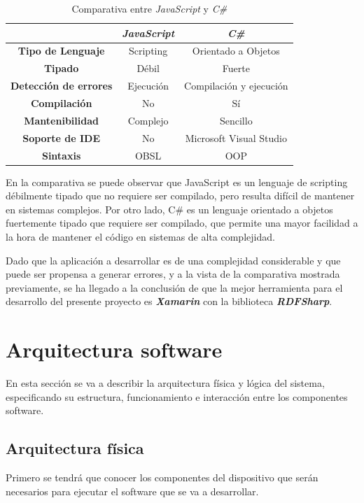 \begin{table}[htb]
\centering
\caption{Comparativa entre \textit{JavaScript} y \textit{C\#}}
\bigskip
\begin{tabular}{|c|c|c|}
    \hline
    & \textit{\textbf{JavaScript}} & \textbf{\textit{C\#}} \\ \hline \hline
    \textbf{Tipo de Lenguaje} & Scripting & Orientado a Objetos \\ \hline
    \textbf{Tipado} & Débil & Fuerte \\ \hline
    \textbf{Detección de errores} & Ejecución & Compilación y ejecución \\ \hline
    \textbf{Compilación} & No & Sí \\ \hline
    \textbf{Mantenibilidad} & Complejo & Sencillo \\ \hline
    \textbf{Soporte de IDE} & No & Microsoft Visual Studio \\ \hline
    \textbf{Sintaxis} & OBSL & OOP \\ \hline
\end{tabular}
\end{table}  


En la comparativa se puede observar que JavaScript es un lenguaje de scripting débilmente tipado que 
no requiere ser compilado, pero resulta difícil de mantener en sistemas complejos. Por otro lado, 
C\# es un lenguaje orientado a objetos fuertemente tipado que requiere ser compilado, que permite 
una mayor facilidad a la hora de mantener el código en sistemas de alta complejidad.

Dado que la aplicación a desarrollar es de una complejidad considerable y que puede ser propensa 
a generar errores, y a la vista de la comparativa mostrada previamente, se ha llegado a la conclusión 
de que la mejor herramienta para el desarrollo del presente proyecto es \textit{\textbf{Xamarin}} con 
la biblioteca \textit{\textbf{RDFSharp}}.

\section{Arquitectura software}
En esta sección se va a describir la arquitectura física y lógica del sistema, especificando su estructura, funcionamiento e 
interacción entre los componentes software.

\subsection{Arquitectura física}
Primero se tendrá que conocer los componentes del dispositivo que serán necesarios para ejecutar el software que se 
va a desarrollar. \medskip

